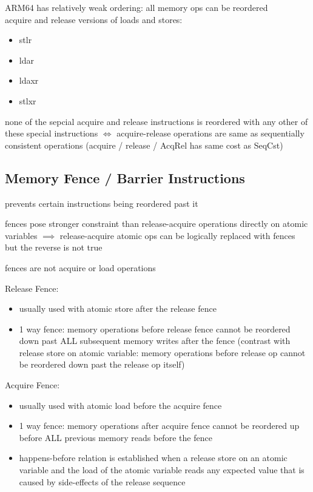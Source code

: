 \documentclass[8pt]{extarticle}
\begin{document}
\begin{multicols*}{2}
    ARM64 has relatively weak ordering: all memory ops can be reordered\\
    acquire and release versions of loads and stores:
    \begin{itemize}
    \item stlr
    \item ldar
    \item ldaxr
    \item stlxr
    \end{itemize}

    none of the sepcial acquire and release instructions is reordered with any other of these special instructions
    $\iff$ acquire-release operations are same as sequentially consistent operations (acquire / release / AcqRel has same cost as SeqCst)

    \subsection{Memory Fence / Barrier Instructions}

    prevents certain instructions being reordered past it

    fences pose stronger constraint than release-acquire operations directly on atomic variables $\implies$ release-acquire atomic ops can be logically replaced with fences but the reverse is not true

    fences are not acquire or load operations

    Release Fence:
    \begin{itemize}
    \item usually used with atomic store after the release fence
    \item 1 way fence: memory operations before release fence cannot be reordered down past ALL subsequent memory writes after the fence (contrast with release store on atomic variable: memory operations before release op cannot be reordered down past the release op itself)
    \end{itemize}

    Acquire Fence: 
    \begin{itemize}
    \item usually used with atomic load before the acquire fence
    \item 1 way fence: memory operations after acquire fence cannot be reordered up before ALL previous memory reads before the fence
    \item happens-before relation is established when a release store on an atomic variable and the load of the atomic variable reads any expected value that is caused by side-effects of the release sequence
    \end{itemize}


\end{multicols*}
\end{document}
